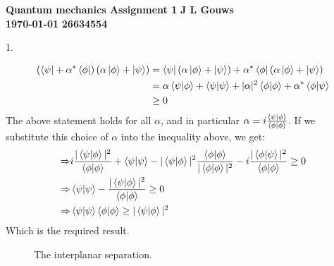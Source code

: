 \documentclass[a4paper,12pt]{article}
\newcommand\block[1]{\hspace*{#1}}
\begin{document}
\selectfont
{\Large \textbf{Quantum mechanics Assignment 1}} \hfill {\Large \textbf{J L Gouws}}\\
\block{1.0cm} {\large \textbf{\today}} \hfill {\large \textbf{26634554}}\\
\thispagestyle{empty}

1.
\begin{minipage}[t]{0.9\textwidth}
  \begin{align*}
    \left(\bra{\psi} + \alpha^* \bra{\phi}\right)\left(\alpha \ket{\phi} + \ket{\psi}\right) &= \bra{\psi}\left(\alpha \ket{\phi} + \ket{\psi}\right) + \alpha^* \bra{\phi}\left(\alpha \ket{\phi} + \ket{\psi}\right)\\
                                                                                             &= \alpha \braket{\psi|\phi} + \braket{\psi|\psi} + |\alpha|^2 \braket{\phi | \phi}+ \alpha^*\braket{\phi|\psi}\\
                                                                                             & \geq 0\\
  \end{align*}
  The above statement holds for all $\alpha$, and in particular $\alpha = i\frac{\braket{\psi|\phi}}{\braket{\phi | \phi}}$.
  If we substitute this choice of $\alpha$ into the inequality above, we get:
  \begin{align*}
    \Rightarrow & i \frac{|\braket{\psi|\phi}|^2}{\braket{\phi|\phi}} + \braket{\psi|\psi} - |\braket{\psi|\phi}|^2\frac{\braket{\phi | \phi}}{|\braket{\phi | \phi}|^2} - i \frac{|\braket{\phi|\psi}|^2}{\braket{\phi|\phi}} \geq 0\\
    \Rightarrow & \braket{\psi|\psi} - \frac{|\braket{\psi|\phi}|^2}{\braket{\phi | \phi}} \geq 0\\
    \Rightarrow & \braket{\psi|\psi} \braket{\phi | \phi} \geq |\braket{\psi|\phi}|^2
  \end{align*}
  Which is the required result.\\
\end{minipage}

\iffalse
\begin{figure}
  \centering
  \caption{The interplanar separation.}
  \label{fig:planeSep}
\end{figure}
\end{document}
